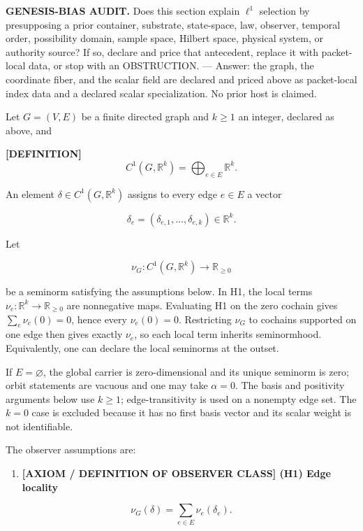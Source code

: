 \documentclass[
  11pt,
]{article}
\providecommand{\tightlist}{%
  \setlength{\itemsep}{0pt}\setlength{\parskip}{0pt}}
\providecommand{\tightlist}{%
  \setlength{\itemsep}{0pt}\setlength{\parskip}{0pt}}
\renewenvironment{quote}
  {\begin{leftbar}\small}
  {\end{leftbar}}
\begin{document}
\begin{quote}
\textbf{GENESIS-BIAS AUDIT.} Does this section explain \(\ell^1\)
selection by presupposing a prior container, substrate, state-space,
law, observer, temporal order, possibility domain, sample space, Hilbert
space, physical system, or authority source? If so, declare and price
that antecedent, replace it with packet-local data, or stop with an
OBSTRUCTION. --- Answer: the graph, the coordinate fiber, and the scalar
field are declared and priced above as packet-local index data and a
declared scalar specialization. No prior host is claimed.
\end{quote}

Let \(G=(V,E)\) be a finite directed graph and \(k\ge1\) an integer,
declared as above, and

\textbf{{[}DEFINITION{]}} \[
C^1(G,\mathbb R^k)=\bigoplus_{e\in E}\mathbb R^k.
\]

An element \(\delta\in C^1(G,\mathbb R^k)\) assigns to every edge
\(e\in E\) a vector

\[
\delta_e=(\delta_{e,1},\ldots,\delta_{e,k})\in\mathbb R^k.
\]

Let

\[
\nu_G:C^1(G,\mathbb R^k)\to\mathbb R_{\ge0}
\]

be a seminorm satisfying the assumptions below. In H1, the local terms
\(\nu_e:\mathbb R^k\to\mathbb R_{\ge0}\) are nonnegative maps.
Evaluating H1 on the zero cochain gives \(\sum_e\nu_e(0)=0\), hence
every \(\nu_e(0)=0\). Restricting \(\nu_G\) to cochains supported on one
edge then gives exactly \(\nu_e\), so each local term inherits
seminormhood. Equivalently, one can declare the local seminorms at the
outset.

If \(E=\varnothing\), the global carrier is zero-dimensional and its
unique seminorm is zero; orbit statements are vacuous and one may take
\(\alpha=0\). The basis and positivity arguments below use \(k\ge1\);
edge-transitivity is used on a nonempty edge set. The \(k=0\) case is
excluded because it has no first basis vector and its scalar weight is
not identifiable.

The observer assumptions are:

\begin{enumerate}
\def\labelenumi{\arabic{enumi}.}
\tightlist
\item
  \textbf{{[}AXIOM / DEFINITION OF OBSERVER CLASS{]} (H1) Edge locality}
\end{enumerate}

\[
\nu_G(\delta)=\sum_{e\in E}\nu_e(\delta_e).
\]
\end{document}
